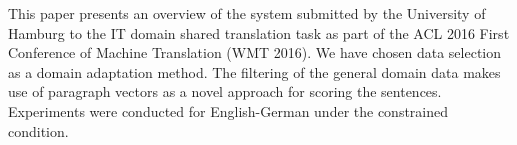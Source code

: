 This paper presents an overview of the system submitted by the University of Hamburg to the IT domain shared translation task as part of the ACL 2016 First Conference of Machine Translation (WMT 2016). We have chosen data selection as a domain adaptation method. The filtering of the general  domain data makes use of paragraph vectors as a novel approach for scoring the sentences. Experiments were conducted for English-German under the constrained condition.

